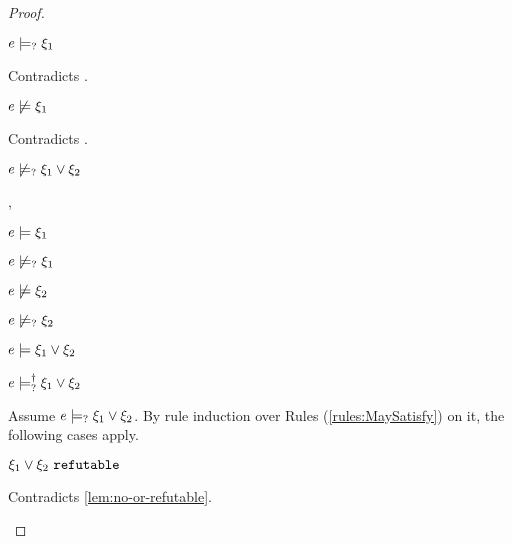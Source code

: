 \begin{proof}
\begin{byCases}
\begin{byCases}
\begin{byCases}
\begin{pfsteps*}
            \item $e \models_{?} \xi_1$ 
            \end{pfsteps*}
            Contradicts .
        \item[\text{(\ref{rule:CMSOr2})}]
            \begin{pfsteps*}
            \item $e \not\models \xi_1$ 
            \end{pfsteps*}
            Contradicts .
        \end{byCases}
        \begin{pfsteps*}
        \item $e \not\models_{?} \xi_1 \vee \xi_2$ 
        \end{pfsteps*}
    \item[\csatisfy{e}{\xi_1},\cnotsatisfyormay{e}{\xi_2}]
        \begin{pfsteps*}
        \item $e \models \xi_1$  
        \item $e \not\models_{?} \xi_1$  
        \item $e \not\models \xi_2$  
        \item $e \not\models_{?} \xi_2$  
        \item $e \models \xi_1 \vee \xi_2$  
        \item $e \models_{?}^{\dag} \xi_1 \vee \xi_2$ 
        \end{pfsteps*}
        Assume $e \models_{?} \xi_1 \vee \xi_2$. By rule induction over Rules (\ref{rules:MaySatisfy}) on it, the following cases apply.
        \begin{byCases}
        \item[\text{(\ref{rule:CMSNotVal})}]
            \begin{pfsteps*}
            \item $\xi_1 \vee \xi_2 ~\mathtt{refutable}$ 
            \end{pfsteps*}
            Contradicts \autoref{lem:no-or-refutable}.

\end{byCases}
\end{byCases}
\end{byCases}
\end{proof}
